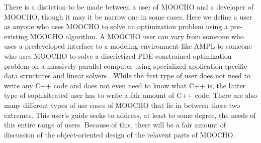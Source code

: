 \documentclass[pdf,ps2pdf,11pt]{SANDreport}
\begin{document}
There is a distiction to be made between a user of MOOCHO and a developer of
MOOCHO, though it may it be narrow one in some cases.  Here we define a user
as anyone who uses MOOCHO to solve an optimization problem using a
pre-existing MOOCHO algorithm.  A MOOCHO user can vary from someone who uses a
predeveloped interface to a modeling environment like AMPL
{}\cite{ref:ampl_1993} to someone who uses MOOCHO to solve a discrietized
PDE-constrained optimization problem on a massively parallel computer using
specialized application-specific data structures and linear solvers
{}\cite{ref:biros_1999}.  While the first type of user does not need to write
any C++ code and does not even need to know what C++ is, the latter type of
sophisitcated user has to write a fair amount of C++ code.  There are also
many different types of use cases of MOOCHO that lie in between these two
extremes.  This user's guide seeks to address, at least to some degree, the
needs of this entire range of users.  Because of this, there will be a fair
amount of discussion of the object-oriented design of the relavent parts of
MOOCHO.

%
%
\end{document}
